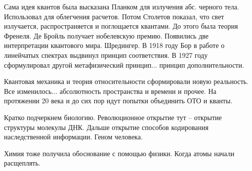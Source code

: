 \documentclass[a4paper, 12pt]{article}
\begin{document}
Сама идея квантов была высказана Планком для излучения абс. черного 
тела. Использовал для облегчения расчетов. Потом Столетов показал, что 
свет излучается, распространяется и поглощается квантами. До этого была 
теория Френеля. Де Бройль получает нобелевскую премию. Появились две 
интерпретации квантового мира. Шредингер. В 1918 году Бор в работе 
о линейчатых спектрах выдвинул принцип соответствия. В 1927 году 
сформулировал другой метафизический принцип... принцип дополнительности.

Квантовая механика и теория относительности сформировали новую 
реальность. Все изменилось... абсолютность пространства и времени 
и прочее. На протяжении 20 века и до сих пор идут попытки объединить ОТО 
и кванты.

Кратко подчеркнем биологию. Революционное открытие тут -- открытие 
структуры молекулы ДНК. Дальше открытие способов кодирования 
наследственной информации. Геном человека.

Химия тоже получила обоснование с помощью физики. Когда атомы начали 
расщеплять.
\end{document}
